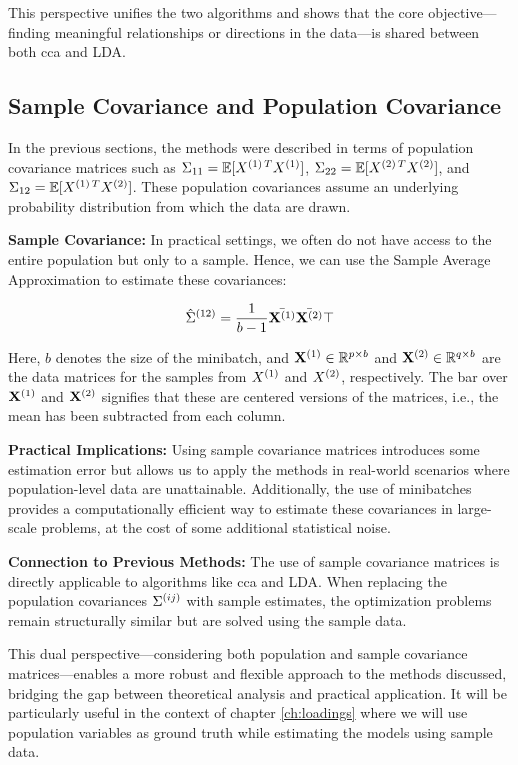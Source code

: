 This perspective unifies the two algorithms and shows that the core objective—finding meaningful relationships or directions in the data—is shared between both \acrshort{cca} and LDA.

\subsection{Sample Covariance and Population Covariance}
In the previous sections, the methods were described in terms of population covariance matrices such as \(\Sigma_{11}=\mathbb{E}[X^{(1)\,T} X^{(1)}]\), \(\Sigma_{22}=\mathbb{E}[X^{(2)\,T} X^{(2)}]\), and \(\Sigma_{12}=\mathbb{E}[X^{(1)\,T} X^{(2)}]\). These population covariances assume an underlying probability distribution from which the data are drawn.

\textbf{Sample Covariance:} In practical settings, we often do not have access to the entire population but only to a sample. Hence, we can use the Sample Average Approximation to estimate these covariances:

\[
    \hat{\Sigma}^{(12)} = \frac{1}{b-1} \bar{\mathbf{X}^{(1)}} \bar{\mathbf{X}^{(2)}}\top
\]

Here, \(b\) denotes the size of the minibatch, and \(\mathbf{X}^{(1)} \in \mathbb{R}^{p \times b}\) and \(\mathbf{X}^{(2)} \in \mathbb{R}^{q \times b}\) are the data matrices for the samples from \(X^{(1)}\) and \(X^{(2)}\), respectively. The bar over \(\mathbf{X}^{(1)}\) and \(\mathbf{X}^{(2)}\) signifies that these are centered versions of the matrices, i.e., the mean has been subtracted from each column.

\textbf{Practical Implications:} Using sample covariance matrices introduces some estimation error but allows us to apply the methods in real-world scenarios where population-level data are unattainable. Additionally, the use of minibatches provides a computationally efficient way to estimate these covariances in large-scale problems, at the cost of some additional statistical noise.

\textbf{Connection to Previous Methods:} The use of sample covariance matrices is directly applicable to algorithms like \acrshort{cca} and LDA. When replacing the population covariances \(\Sigma^{(ij)}\) with sample estimates, the optimization problems remain structurally similar but are solved using the sample data.

This dual perspective—considering both population and sample covariance matrices—enables a more robust and flexible approach to the methods discussed, bridging the gap between theoretical analysis and practical application.
It will be particularly useful in the context of chapter \ref{ch:loadings} where we will use population variables as ground truth while estimating the models using sample data.


